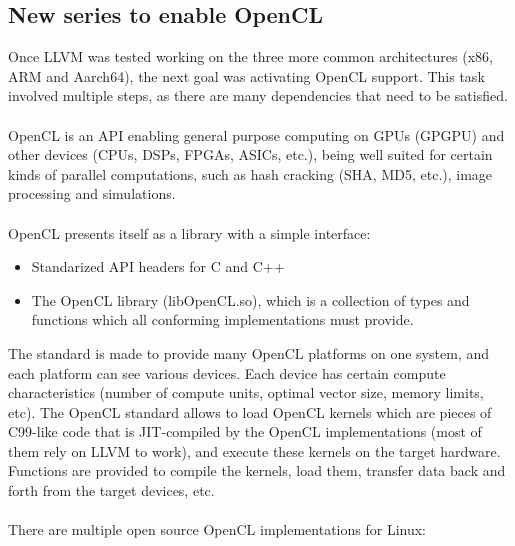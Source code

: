 \documentclass[12pt,a4paper,oneside]{article}
\begin{document}
\subsection*{New series to enable OpenCL}
Once LLVM was tested working on the three more common architectures (x86, ARM and
Aarch64), the next goal was activating OpenCL support. This task involved
multiple steps, as there are many dependencies that need to be satisfied.\\\\
OpenCL is an API enabling general purpose computing on GPUs (GPGPU) and other
devices (CPUs, DSPs, FPGAs, ASICs, etc.), being well suited for certain kinds of
parallel computations, such as hash cracking (SHA, MD5, etc.), image processing and
simulations.\\\\
OpenCL presents itself as a library with a simple interface:
\begin{itemize}
  \item Standarized API headers for C and C++
  \item The OpenCL library (libOpenCL.so), which is a collection of types and
  functions which all conforming implementations must provide.
\end{itemize}
The standard is made to provide many OpenCL platforms on one system, and each
platform can see various devices. Each device has certain compute characteristics
(number of compute units, optimal vector size, memory limits, etc). The OpenCL
standard allows to load OpenCL kernels which are pieces of C99-like code that is
JIT-compiled by the OpenCL implementations (most of them rely on LLVM to work),
and execute these kernels on the target hardware. Functions are provided to
compile the kernels, load them, transfer data back and forth from the target
devices, etc.\\\\
There are multiple open source OpenCL implementations for Linux:
\end{document}

